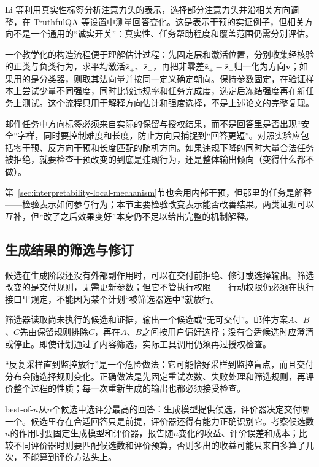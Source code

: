Li 等利用真实性标签分析注意力头的表示，选择部分注意力头并沿相关方向调整，在 TruthfulQA 等设置中测量回答变化。这是表示干预的实证例子，但相关方向不是一个通用的“诚实开关”：真实性、任务帮助程度和覆盖范围仍需分别评估。

一个教学化的构造流程便于理解估计过程：先固定层和激活位置，分别收集经核验的正类与负类行为，求平均激活$\bar{\bm z}_{+}$、$\bar{\bm z}_{-}$，再把非零差$\bar{\bm z}_{+}-\bar{\bm z}_{-}$归一化为方向$\bm v$；如果用的是分类器，则取其法向量并按同一定义确定朝向。保持参数固定，在验证样本上尝试少量不同强度，同时比较违规率和任务完成度，选定后冻结强度再在新任务上测试。这个流程只用于解释方向估计和强度选择，不是上述论文的完整复现。

邮件任务中方向标签必须来自实际的保留与授权结果，而不是回答里是否出现“安全”字样，同时要控制难度和长度，防止方向只捕捉到“回答更短”。对照实验应包括零干预、反方向干预和长度匹配的随机方向。如果违规下降的同时大量合法任务被拒绝，就要检查干预改变的到底是违规行为，还是整体输出倾向（变得什么都不做）。

第~\ref{sec:interpretability-local-mechanism}节也会用内部干预，但那里的任务是解释——检验表示如何参与行为；本节主要检验改变表示能否改善结果。两类证据可以互补，但“改了之后效果变好”本身仍不足以给出完整的机制解释。

\subsection{生成结果的筛选与修订}
\label{sec:alignment-intervention-selection}

候选在生成阶段还没有外部副作用时，可以在交付前拒绝、修订或选择输出。筛选改变的是交付规则，无需更新参数；但它不管执行权限——行动权限仍必须在执行接口里规定，不能因为某个计划“被筛选器选中”就放行。

筛选器读取尚未执行的候选和证据，输出一个候选或“无可交付”。邮件方案$A$、$B$、$C$先由保留规则排除$C$，再在$A$、$B$之间按用户偏好选择；没有合适候选时应澄清或停止。即使计划通过了内容筛选，实际工具调用仍须再过授权检查。

“反复采样直到监控放行”是一个危险做法：它可能恰好采样到监控盲点，而且交付分布会随选择规则变化。正确做法是先固定重试次数、失败处理和筛选规则，再评价整个过程的性质；每一次重新生成的输出也都必须接受检查。

best-of-$n$从$n$个候选中选评分最高的回答：生成模型提供候选，评价器决定交付哪一个。候选里存在合适回答只是前提，评价器还得有能力正确识别它。考察候选数$n$的作用时要固定生成模型和评价器，报告随$n$变化的收益、评价误差和成本；比较不同评价器时则要匹配候选数和评价预算，否则多出的收益可能只来自多算了几次，不能算到评价方法头上。

